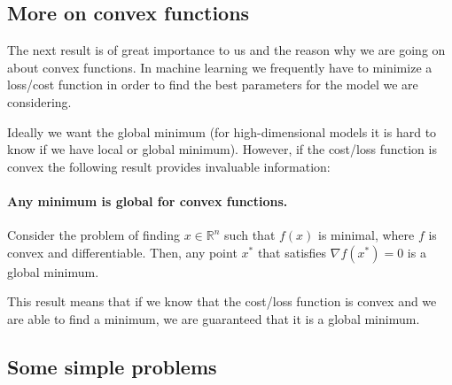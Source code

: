 \documentclass[%
oneside,                 %
final,                   %
10pt]{article}
\begin{document}
\subsection*{More on convex functions}

The next result is of great importance to us and the reason why we are
going on about convex functions. In machine learning we frequently
have to minimize a loss/cost function in order to find the best
parameters for the model we are considering. 

Ideally we want the
global minimum (for high-dimensional models it is hard to know
if we have local or global minimum). However, if the cost/loss function
is convex the following result provides invaluable information:


\paragraph{Any minimum is global for convex functions.}
Consider the problem of finding $x \in \mathbb{R}^n$ such that $f(x)$
is minimal, where $f$ is convex and differentiable. Then, any point
$x^*$ that satisfies $\nabla f(x^*) = 0$ is a global minimum.



This result means that if we know that the cost/loss function is convex and we are able to find a minimum, we are guaranteed that it is a global minimum.

\subsection*{Some simple problems}
\end{document}
